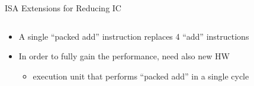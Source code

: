 \documentclass[aspectratio=169,12pt]{beamer}
\begin{document}
\begin{frame}{ISA Extensions for Reducing IC}
\begin{columns}
\end{columns}

\vspace{0.5cm}
\begin{itemize}
    \item A single ``packed add'' instruction replaces 4 ``add'' instructions
    \item In order to fully gain the performance, need also new HW
    \begin{itemize}
        \item execution unit that performs ``packed add'' in a single cycle
    \end{itemize}
\end{itemize}
\end{frame}
\end{document}
